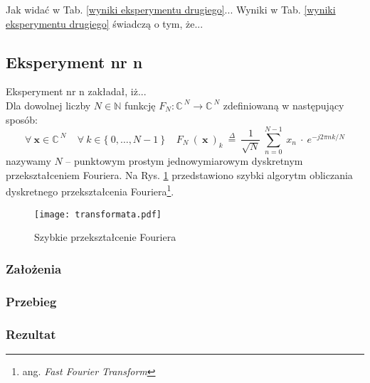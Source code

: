 \documentclass[12pt]{article}
\begin{document}
\noindent Jak widać w Tab. \ref{wyniki eksperymentu drugiego}...\newline
Wyniki w Tab. \ref{wyniki eksperymentu drugiego} świadczą o tym, że...


\subsection{Eksperyment nr n}
Eksperyment nr n zakładał, iż...\\
Dla dowolnej liczby $N \in \mathbb{N}$ funkcję 
$F_{N}:\mathbb{C}^{\:N}\!\rightarrow\mathbb{C}^{\:N}$
zdefiniowaną w następujący sposób:
\vspace{-0.4cm}
\begin{equation}
 \forall\:\mathbf{x} \in \mathbb{C}^{\:N}\:\:\:\:\:
 \forall\:k \in \{\:0,\dots,N - 1\:\!\}\:\:\:\:\:
 F_{N}\:\!(\:\mathbf{x}\:)_{k}\:\stackrel{\Delta}{=}\:
 \frac{1}{\sqrt{N}}\:
 \sum_{n = 0}^{N - 1}\:x_{n}\:\cdot\:
 e^{-j 2 \pi n k / N}
 \label{równanie dyskretnej transformaty Fouriera}
\end{equation}
nazywamy $N$ -- punktowym prostym jednowymiarowym dyskretnym przekształceniem Fouriera.
Na Rys. \ref{FFT} przedstawiono szybki algorytm obliczania dyskretnego 
przekształcenia Fouriera\footnote{ang. \textit{Fast Fourier Transform}}.
\begin{figure}[h!]
 \centering
 \texttt{[image: transformata.pdf]}
 \vspace{-0.1cm}
 \caption{Szybkie przekształcenie Fouriera}
 \label{FFT}
\end{figure}

\subsubsection{Założenia}

\subsubsection{Przebieg}

\subsubsection{Rezultat}
\newpage
\end{document}
